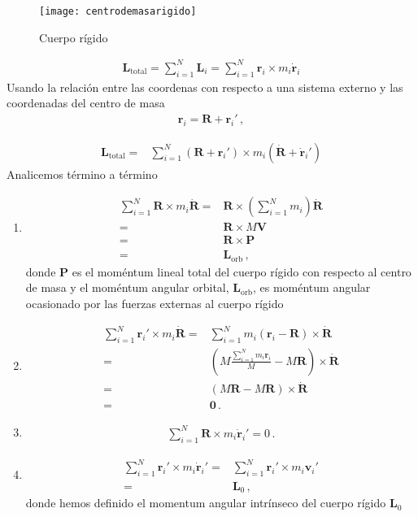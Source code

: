\begin{frame}
\begin{figure}
  \centering
  \texttt{[image: centrodemasarigido]}
  \caption{Cuerpo rígido}
  \label{fig:centrodemasarigido}
\end{figure}
\end{frame}
\begin{align}
  \mathbf{L}_{\text{total}}=\sum_{i=1}^N\mathbf{L}_i=\sum_{i=1}^N \mathbf{r}_i\times m_i\dot{\mathbf{r}}_i
\end{align}
Usando la relación entre las coordenas con respecto a una sistema
externo y las coordenadas del centro de masa
\begin{align}
  \mathbf{r}_i=\mathbf{R}+\mathbf{r}_i'\,,
\end{align}

\begin{align}
   \mathbf{L}_{\text{total}}=&\sum_{i=1}^N
   \left(\mathbf{R}+\mathbf{r}_i'\right)\times m_i
   \left(\dot{\mathbf{R}}+\dot{\mathbf{r}}_i'\right)
\end{align}
Analicemos término a término
\begin{enumerate}
\item 
\begin{align*}
  \sum_{i=1}^N\mathbf{R}\times m_i\dot{\mathbf{R}}=&\mathbf{R}\times
  \left(\sum_{i=1}^N m_i\right)\dot{\mathbf{R}}\nonumber\\
  =&\mathbf{R}\times M\mathbf{V}\nonumber\\
  =&\mathbf{R}\times \mathbf{P}\nonumber\\
  =&\mathbf{L}_{\text{orb}}\,,
\end{align*}
donde $\mathbf{P}$ es el moméntum lineal total del cuerpo rígido con
respecto al centro de masa y el moméntum angular orbital,
$\mathbf{L}_{\text{orb}}$, es moméntum angular ocasionado por las
fuerzas externas al cuerpo rígido
\item
  \begin{align}
    \label{eq:rmr}
    \sum_{i=1}^N\mathbf{r}_i'\times m_i \dot{\mathbf{R}}
    =&\sum_{i=1}^N m_i\left(\mathbf{r}_i-\mathbf{R}\right)\times  \dot{\mathbf{R}}\nonumber\\
    =&\left(M\frac{\sum_{i=1}^N m_i\mathbf{r}_i}{M}- M \mathbf{R}\right)\times  \dot{\mathbf{R}}\nonumber\\
    =&\left(M\mathbf{R}- M \mathbf{R}\right)\times  \dot{\mathbf{R}}\nonumber\\
    =&\mathbf{0}\,.
  \end{align}
\item
  \begin{align*}
    \sum_{i=1}^N \mathbf{R}\times m_i \dot{\mathbf{r}}_i'=0\,.
  \end{align*}
\item
  \begin{align*}
    \sum_{i=1}^N \mathbf{r}_i'\times m_i \dot{\mathbf{r}}_i'=&
    \sum_{i=1}^N \mathbf{r}_i'\times m_i \mathbf{v}_i'\nonumber\\
    =&\mathbf{L}_0\,,
  \end{align*}
donde hemos definido el momentum angular intrínseco del cuerpo rígido $\mathbf{L}_0$


\end{enumerate}

